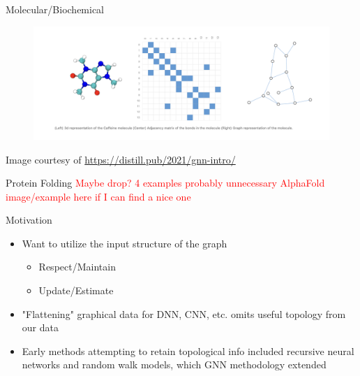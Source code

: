 \documentclass{beamer}
\begin{document}
\begin{frame}{Molecular/Biochemical}
    \begin{figure}
        \centering
        \includegraphics[scale=0.3]{Caffeine_Graph.png}
    \end{figure}
    Image courtesy of \url{https://distill.pub/2021/gnn-intro/} \cite{sanchez-lengeling_gentle_2021}
\end{frame}

\begin{frame}{Protein Folding \textcolor{red}{Maybe drop? 4 examples probably unnecessary}}
    \textcolor{red}{AlphaFold image/example here if I can find a nice one }
\end{frame}

\begin{frame}{Motivation}
    \begin{itemize}
        \item Want to utilize the input structure of the graph
        \begin{itemize}
            \item Respect/Maintain
            \item Update/Estimate
        \end{itemize} 
        \item "Flattening" graphical data for DNN, CNN, etc. omits useful topology from our data 
        \item Early methods attempting to retain topological info included recursive neural networks and random walk models, which GNN methodology extended \cite{scarselli_graph_2009} 
    \end{itemize}
\end{frame}
\end{document}
